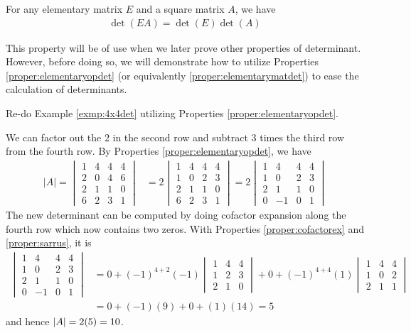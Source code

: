 \begin{proper}
\label{proper:elementarytimesdet}
For any elementary matrix $E$ and a square matrix $A$, we have
\begin{align}
\det(EA) = \det(E)\det(A)
\end{align}
\end{proper}
This property will be of use when we later prove other properties of determinant. However, before doing so, we will demonstrate how to utilize Properties \ref{proper:elementaryopdet} (or equivalently \ref{proper:elementarymatdet}) to ease the calculation of determinants.
\begin{exmp}
Re-do Example \ref{exmp:4x4det} utilizing Properties \ref{proper:elementaryopdet}.
\end{exmp}
\begin{solution}
We can factor out the $2$ in the second row and subtract $3$ times the third row from the fourth row. By Properties \ref{proper:elementaryopdet}, we have
\begin{align*}
|A| = 
\begin{vmatrix}
1 & 4 & 4 & 4 \\
2 & 0 & 4 & 6 \\
2 & 1 & 1 & 0 \\
6 & 2 & 3 & 1
\end{vmatrix}
&=
2
\begin{vmatrix}
1 & 4 & 4 & 4 \\
1 & 0 & 2 & 3 \\
2 & 1 & 1 & 0 \\
6 & 2 & 3 & 1
\end{vmatrix} = 
2
\begin{vmatrix}
1 & 4 & 4 & 4 \\
1 & 0 & 2 & 3 \\
2 & 1 & 1 & 0 \\
0 & -1 & 0 & 1
\end{vmatrix} 
\end{align*}
The new determinant can be computed by doing cofactor expansion along the fourth row which now contains two zeros. With Properties \ref{proper:cofactorex} and \ref{proper:sarrus}, it is
\begin{align*}
\begin{vmatrix}
1 & 4 & 4 & 4 \\
1 & 0 & 2 & 3 \\
2 & 1 & 1 & 0 \\
0 & -1 & 0 & 1
\end{vmatrix}
&= 0 + (-1)^{4+2}(-1)
\begin{vmatrix}
1 & 4 & 4 \\
1 & 2 & 3 \\
2 & 1 & 0 
\end{vmatrix} 
+ 0 + (-1)^{4+4}(1)
\begin{vmatrix}
1 & 4 & 4 \\
1 & 0 & 2 \\
2 & 1 & 1 
\end{vmatrix} \\
&= 0 + (-1)(9) + 0 + (1)(14) = 5
\end{align*}
and hence $\abs{A} = 2(5) = 10$.
\end{solution}

